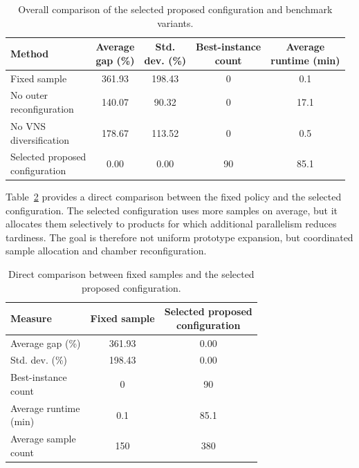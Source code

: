 \documentclass[11pt]{article}
\begin{document}
\begin{table}[H]
\centering
\caption{Overall comparison of the selected proposed configuration and benchmark variants.}
\label{tab:main_benchmark_comparison_short}
\small
\begin{tabular}{lcccc}
\hline
\textbf{Method}
& \shortstack{\textbf{Average}\\\textbf{gap (\%)}}
& \shortstack{\textbf{Std.}\\\textbf{dev. (\%)}}
& \shortstack{\textbf{Best-instance}\\\textbf{count}}
& \shortstack{\textbf{Average}\\\textbf{runtime (min)}} \\
\hline
Fixed sample & 361.93 & 198.43 & 0 & 0.1 \\
\shortstack[l]{No outer\\reconfiguration} & 140.07 & 90.32 & 0 & 17.1 \\
\shortstack[l]{No VNS\\diversification} & 178.67 & 113.52 & 0 & 0.5 \\
\shortstack[l]{Selected proposed\\configuration} & 0.00 & 0.00 & 90 & 85.1 \\
\hline
\end{tabular}
\end{table}

Table~\ref{tab:fixed_selected_sample_comparison_short} provides a direct comparison between the fixed policy and the selected configuration. The selected configuration uses more samples on average, but it allocates them selectively to products for which additional parallelism reduces tardiness. The goal is therefore not uniform prototype expansion, but coordinated sample allocation and chamber reconfiguration.

\begin{table}[H]
\centering
\caption{Direct comparison between fixed samples and the selected proposed configuration.}
\label{tab:fixed_selected_sample_comparison_short}
\begin{tabular}{lcc}
\hline
\textbf{Measure}
& \textbf{Fixed sample}
& \shortstack{\textbf{Selected proposed}\\\textbf{configuration}} \\
\hline
Average gap (\%) & 361.93 & 0.00 \\
Std. dev. (\%) & 198.43 & 0.00 \\
\shortstack[l]{Best-instance\\count} & 0 & 90 \\
\shortstack[l]{Average runtime\\(min)} & 0.1 & 85.1 \\
\shortstack[l]{Average sample\\count} & 150 & 380 \\
\hline
\end{tabular}
\end{table}
\end{document}
